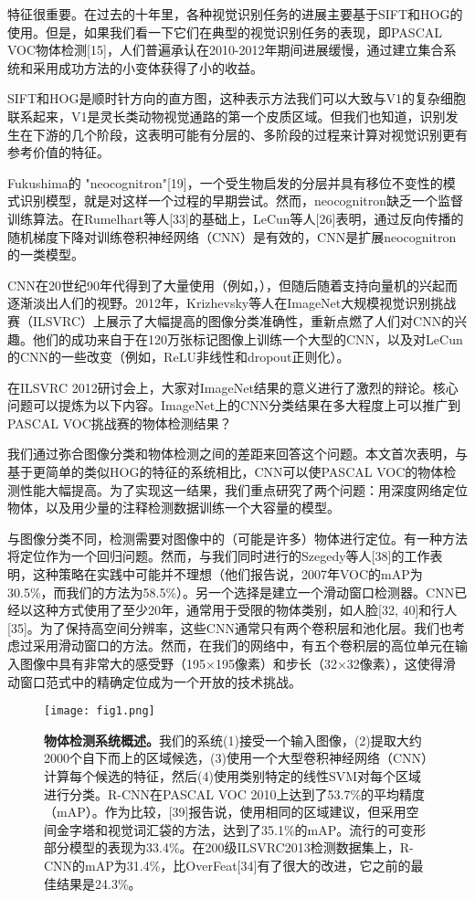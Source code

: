 \documentclass[../main.tex]{subfile}
\begin{document}
特征很重要。在过去的十年里，各种视觉识别任务的进展主要基于SIFT\cite{sift}和HOG\cite{hog}的使用。但是，如果我们看一下它们在典型的视觉识别任务的表现，即PASCAL VOC物体检测[15]，人们普遍承认在2010-2012年期间进展缓慢，通过建立集合系统和采用成功方法的小变体获得了小的收益。

SIFT和HOG是顺时针方向的直方图，这种表示方法我们可以大致与V1的复杂细胞联系起来，V1是灵长类动物视觉通路的第一个皮质区域。但我们也知道，识别发生在下游的几个阶段，这表明可能有分层的、多阶段的过程来计算对视觉识别更有参考价值的特征。

Fukushima的 "neocognitron"[19]，一个受生物启发的分层并具有移位不变性的模式识别模型，就是对这样一个过程的早期尝试。然而，neocognitron缺乏一个监督训练算法。在Rumelhart等人[33]的基础上，LeCun等人[26]表明，通过反向传播的随机梯度下降对训练卷积神经网络（CNN）是有效的，CNN是扩展neocognitron的一类模型。

CNN在20世纪90年代得到了大量使用（例如，\cite{classic_move}），但随后随着支持向量机的兴起而逐渐淡出人们的视野。2012年，Krizhevsky等人\cite{alexnet}在ImageNet大规模视觉识别挑战赛（ILSVRC）\cite{imagenet}上展示了大幅提高的图像分类准确性，重新点燃了人们对CNN的兴趣。他们的成功来自于在120万张标记图像上训练一个大型的CNN，以及对LeCun的CNN的一些改变（例如，ReLU非线性和dropout正则化）。

在ILSVRC 2012研讨会上，大家对ImageNet结果的意义进行了激烈的辩论。核心问题可以提炼为以下内容。ImageNet上的CNN分类结果在多大程度上可以推广到PASCAL VOC挑战赛的物体检测结果？

我们通过弥合图像分类和物体检测之间的差距来回答这个问题。本文首次表明，与基于更简单的类似HOG的特征的系统相比，CNN可以使PASCAL VOC的物体检测性能大幅提高。为了实现这一结果，我们重点研究了两个问题：用深度网络定位物体，以及用少量的注释检测数据训练一个大容量的模型。

与图像分类不同，检测需要对图像中的（可能是许多）物体进行定位。有一种方法将定位作为一个回归问题。然而，与我们同时进行的Szegedy等人[38]的工作表明，这种策略在实践中可能并不理想（他们报告说，2007年VOC的mAP为30.5\%，而我们的方法为58.5\%）。另一个选择是建立一个滑动窗口检测器。CNN已经以这种方式使用了至少20年，通常用于受限的物体类别，如人脸[32, 40]和行人[35]。为了保持高空间分辨率，这些CNN通常只有两个卷积层和池化层。我们也考虑过采用滑动窗口的方法。然而，在我们的网络中，有五个卷积层的高位单元在输入图像中具有非常大的感受野（195×195像素）和步长（32×32像素），这使得滑动窗口范式中的精确定位成为一个开放的技术挑战。

\begin{figure}[htb]
    \centering
    \texttt{[image: fig1.png]}
    \caption{\textbf{物体检测系统概述。}我们的系统(1)接受一个输入图像，(2)提取大约2000个自下而上的区域候选，(3)使用一个大型卷积神经网络（CNN）计算每个候选的特征，然后(4)使用类别特定的线性SVM对每个区域进行分类。R-CNN在PASCAL VOC 2010上达到了53.7\%的平均精度（mAP）。作为比较，[39]报告说，使用相同的区域建议，但采用空间金字塔和视觉词汇袋的方法，达到了35.1\%的mAP。流行的可变形部分模型的表现为33.4\%。在200级ILSVRC2013检测数据集上，R-CNN的mAP为31.4\%，比OverFeat[34]有了很大的改进，它之前的最佳结果是24.3\%。}
    \label{fig:fig1}
\end{figure}
\end{document}
